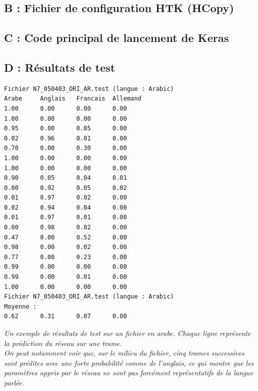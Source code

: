 \documentclass{article}
\begin{document}
\newpage

\subsection*{B : Fichier de configuration HTK (HCopy)}



\newpage

\subsection*{C : Code principal de lancement de Keras} 


\newpage

\subsection*{D : Résultats de test}

\begin{verbatim}
Fichier N7_050403_ORI_AR.test (langue : Arabic)
Arabe     Anglais   Francais  Allemand
1.00      0.00      0.00      0.00
1.00      0.00      0.00      0.00
0.95      0.00      0.05      0.00
0.02      0.96      0.01      0.00
0.70      0.00      0.30      0.00
1.00      0.00      0.00      0.00
1.00      0.00      0.00      0.00
0.90      0.05      0.04      0.01
0.00      0.92      0.05      0.02
0.01      0.97      0.02      0.00
0.02      0.94      0.04      0.00
0.01      0.97      0.01      0.00
0.00      0.98      0.02      0.00
0.47      0.00      0.52      0.00
0.98      0.00      0.02      0.00
0.77      0.00      0.23      0.00
0.99      0.00      0.00      0.00
0.99      0.00      0.01      0.00
1.00      0.00      0.00      0.00
Fichier N7_050403_ORI_AR.test (langue : Arabic)
Moyenne :
0.62      0.31      0.07      0.00
\end{verbatim}
\textit{Un exemple de résultats de test sur un fichier en arabe. Chaque ligne représente la prédiction du réseau sur une trame.\\ On peut notamment voir que, sur le milieu du fichier, cinq trames successives sont prédites avec une forte probabilité comme de l'anglais, ce qui montre que les paramètres appris par le réseau ne sont pas forcément représentatifs de la langue parlée.}
\end{document}
